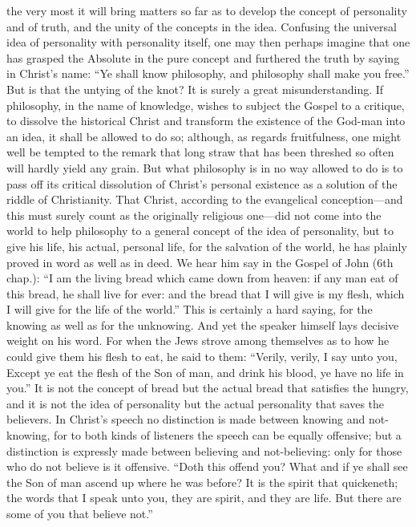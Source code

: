 \documentclass[12pt]{book}
\newcommand{\opage}[1]{\marginnote{\footnotesize\textit{[#1]}}}
\begin{document}
the very most it will bring matters so far as to develop the concept of
personality and of truth, and the unity of the concepts in the idea.
Confusing the universal idea of personality with personality itself, one
may then perhaps imagine that one has grasped the Absolute in the pure
concept and furthered the truth by saying in Christ's name: ``Ye shall
know philosophy, and philosophy shall make you free.'' But is that the
untying of the knot? It is surely a great misunderstanding. If
philosophy, in the name of knowledge, wishes to subject the Gospel to a
critique, to dissolve the historical Christ and transform the existence
of the God-man into an idea, it shall be allowed to do so; although, as
regards fruitfulness, one might well be tempted to the remark that long
straw that has been threshed so often will hardly yield any grain. But
what philosophy is in no way allowed to do is to pass off its critical
dissolution of Christ's
\opage{75}\setcounter{footnote}{0}%
personal existence as a solution of the riddle of Christianity. That
Christ, according to the evangelical conception---and this must surely
count as the originally religious one---did not come into the world to
help philosophy to a general concept of the idea of personality, but to
give his life, his actual, personal life, for the salvation of the
world, he has plainly proved in word as well as in deed. We hear him say
in the Gospel of John (6th chap.): ``I am the living bread which came
down from heaven: if any man eat of this bread, he shall live for ever:
and the bread that I will give is my flesh, which I will give for the
life of the world.'' This is certainly a hard saying, for the knowing as
well as for the unknowing. And yet the speaker himself lays decisive
weight on his word. For when the Jews strove among themselves as to how
he could give them his flesh to eat, he said to them: ``Verily, verily,
I say unto you, Except ye eat the flesh of the Son of man, and drink his
blood, ye have no life in you.'' It is not the concept of bread but the
actual bread that satisfies the hungry, and it is not the idea of
personality but the actual personality that saves the believers. In
Christ's speech no distinction is made between knowing and not-knowing,
for to both kinds of listeners the speech can be equally offensive; but
a distinction is expressly made between believing and not-believing:
only for those who do not believe is it offensive. ``Doth this offend
you? What and if ye shall see the Son of man ascend up where he was
before? It is the spirit that quickeneth; the words that I speak unto
you, they are spirit, and they are life. But there are some of you that
believe not.''
\end{document}
